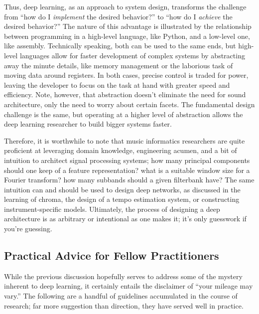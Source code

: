 Thus, deep learning, as an approach to system design, transforms the challenge from ``how do I \emph{implement} the desired behavior?'' to ``how do I \emph{achieve} the desired behavior?''
The nature of this advantage is illustrated by the relationship between programming in a high-level language, like Python, and a low-level one, like assembly.
Technically speaking, both can be used to the same ends, but high-level languages allow for faster development of complex systems by abstracting away the minute details, like memory management or the laborious task of moving data around registers.
In both cases, precise control is traded for power, leaving the developer to focus on the task at hand with greater speed and efficiency.
Note, however, that abstraction doesn't eliminate the need for sound architecture, only the need to worry about certain facets.
The fundamental design challenge is the same, but operating at a higher level of abstraction allows the deep learning researcher to build bigger systems faster.

Therefore, it is worthwhile to note that music informatics researchers are quite proficient at leveraging domain knowledge, engineering acumen, and a bit of intuition to architect signal processing systems;
how many principal components should one keep of a feature representation?
what is a suitable window size for a Fourier transform?
how many subbands should a given filterbank have?
The same intuition can and should be used to design deep networks, as discussed in the learning of chroma, the design of a tempo estimation system, or constructing instrument-specific models.
Ultimately, the process of designing a deep architecture is as arbitrary or intentional as one makes it; it's only guesswork if you're guessing.


\subsection{Practical Advice for Fellow Practitioners}

%
While the previous discussion hopefully serves to address some of the mystery inherent to deep learning, it certainly entails the disclaimer of ``your mileage may vary.''
The following are a handful of guidelines accumulated in the course of research;
far more suggestion than direction, they have served well in practice.

